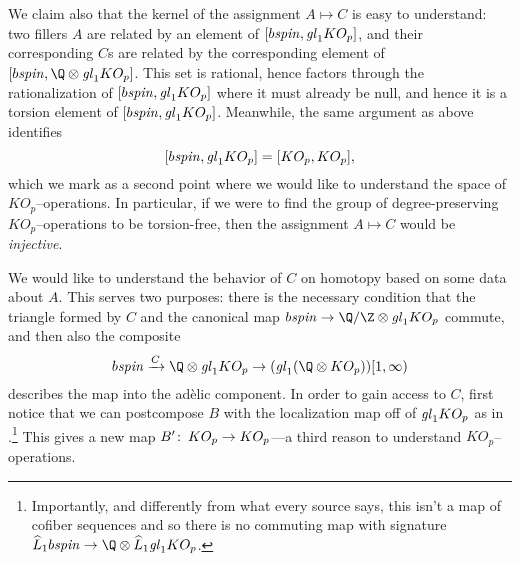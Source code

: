 We claim also that the kernel of the assignment $A \mapsto C$ is easy to understand: two fillers $A$ are related by an element of $[b\mathit{spin}, \mathit{gl}_1 KO_p]$, and their corresponding $C$s are related by the corresponding element of $[b\spin, \Q \otimes \gl_1 KO_p]$.  This set is rational, hence factors through the rationalization of $[b\mathit{spin}, \mathit{gl}_1 KO_p]$ where it must already be null, and hence it is a torsion element of $[b\mathit{spin}, \mathit{gl}_1 KO_p]$.  Meanwhile, the same argument as above identifies \[[b\mathit{spin}, \mathit{gl}_1 KO_p] = [KO_p, KO_p],\] which we mark as a second point where we would like to understand the space of $KO_p$--operations.  In particular, if we were to find the group of degree-preserving $KO_p$--operations to be torsion-free, then the assignment $A \mapsto C$ would be \emph{injective}.

We would like to understand the behavior of $C$ on homotopy based on some data about $A$.  This serves two purposes: there is the necessary condition that the triangle formed by $C$ and the canonical map $b\spin \to \Q / \Z \otimes \gl_1 KO_p$ commute, and then also the composite \[b\spin \xrightarrow{C} \Q \otimes \gl_1 KO_p \to (\gl_1 (\Q \otimes KO_p))[1, \infty)\] describes the map into the ad\`elic component.  In order to gain access to $C$, first notice that we can postcompose $B$ with the localization map off of $\mathit{gl}_1 KO_p$ as in .\footnote{Importantly, and differently from what every source says, this isn't a map of cofiber sequences and so there is no commuting map with signature $\widehat L_1 b\spin \to \Q \otimes \widehat L_1 \gl_1 KO_p$.}  This gives a new map $B'\colon\thinspace KO_p \to KO_p$---a third reason to understand $KO_p$--operations.

